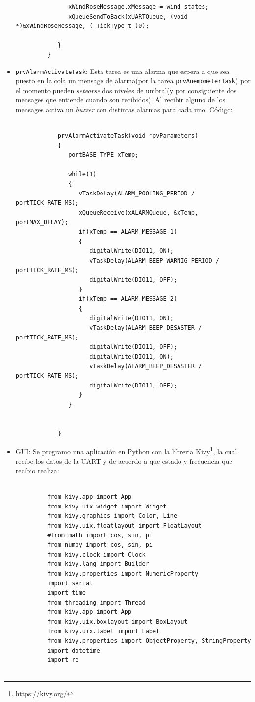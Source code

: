 \documentclass[10pt]{article}
\begin{document}
\begin{itemize}
\begin{verbatim}
               xWindRoseMessage.xMessage = wind_states;
               xQueueSendToBack(xUARTQueue, (void *)&xWindRoseMessage, ( TickType_t )0);

            }
         }
      \end{verbatim}
   \item \verb|prvAlarmActivateTask|: Esta tarea es una alarma que espera a que sea puesto en la cola un mensage de alarma(por la tarea \verb|prvAnemometerTask|) por el momento pueden \textit{setearse} dos niveles de umbral(y por consiguiente dos mensages que entiende cuando son recibidos). Al recibir alguno de los mensages activa un \textit{buzzer} con distintas alarmas para cada uno. Código:
      \begin{verbatim}
         
            prvAlarmActivateTask(void *pvParameters)
            {
               portBASE_TYPE xTemp;

               while(1)
               {
                  vTaskDelay(ALARM_POOLING_PERIOD / portTICK_RATE_MS);
                  xQueueReceive(xALARMQueue, &xTemp,  portMAX_DELAY);
                  if(xTemp == ALARM_MESSAGE_1)
                  {
                     digitalWrite(DIO11, ON);
                     vTaskDelay(ALARM_BEEP_WARNIG_PERIOD / portTICK_RATE_MS);
                     digitalWrite(DIO11, OFF);
                  }
                  if(xTemp == ALARM_MESSAGE_2)
                  {
                     digitalWrite(DIO11, ON);
                     vTaskDelay(ALARM_BEEP_DESASTER / portTICK_RATE_MS);
                     digitalWrite(DIO11, OFF);
                     digitalWrite(DIO11, ON);
                     vTaskDelay(ALARM_BEEP_DESASTER / portTICK_RATE_MS);
                     digitalWrite(DIO11, OFF);
                  }
               }


            }
      \end{verbatim}
   \item GUI: Se programo una aplicación en Python con la libreria Kivy\footnote{\url{https://kivy.org/}}, la cual recibe los datos de la UART y de acuerdo a que estado y frecuencia que recibio realiza:
      \begin{verbatim}
         
         from kivy.app import App
         from kivy.uix.widget import Widget
         from kivy.graphics import Color, Line
         from kivy.uix.floatlayout import FloatLayout
         #from math import cos, sin, pi
         from numpy import cos, sin, pi
         from kivy.clock import Clock
         from kivy.lang import Builder
         from kivy.properties import NumericProperty
         import serial
         import time
         from threading import Thread
         from kivy.app import App
         from kivy.uix.boxlayout import BoxLayout
         from kivy.uix.label import Label
         from kivy.properties import ObjectProperty, StringProperty
         import datetime
         import re


\end{verbatim}
\end{itemize}
\end{document}
